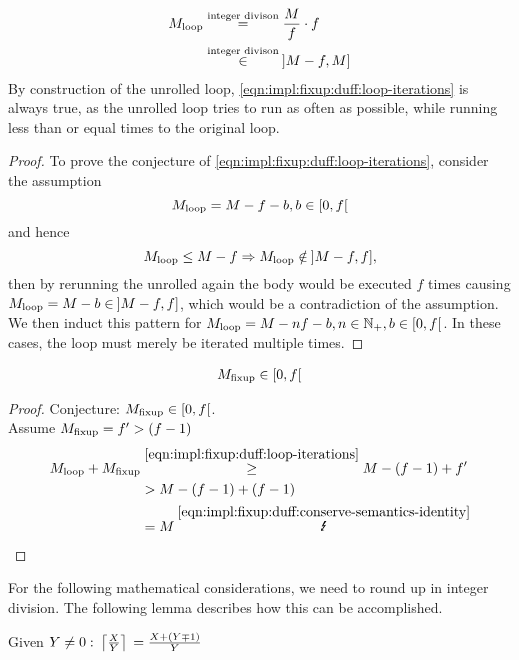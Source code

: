 \begin{equation}\label{eqn:impl:fixup:duff:loop-iterations}
\begin{aligned}
    M_{\text{loop}} &\overset{\text{integer divison}}{=} \frac{M}{f} \cdot f\\
    &\overset{\text{integer divison}}{\in} \medspace \rbrack M-f,M \rbrack
\end{aligned}
\end{equation}
By construction of the unrolled loop, \cref{eqn:impl:fixup:duff:loop-iterations} is always true, as the unrolled loop tries to run as often as possible, while running less than or equal times to the original loop.
\begin{proof}\label{proof:impl:fixup:duff:loop-iterations}
To prove the conjecture of \cref{eqn:impl:fixup:duff:loop-iterations}, consider the assumption
\[M_{\text{loop}} = M - f - b,  b \in \left \lbrack 0, f \right\lbrack \]
and hence
\[M_{\text{loop}} \leq M - f \Rightarrow M_{\text{loop}} \notin \medspace \rbrack M-f,f \rbrack,\]
then by rerunning the unrolled again the body would be executed $f$ times causing $M_{\text{loop}} = M - b \in \medspace \rbrack M-f,f \rbrack$, which would be a contradiction of the assumption.
We then induct this pattern for $M_{\text{loop}} = M - nf - b, n \in \mathbb{N}_{+}, b \in \lbrack 0, f \lbrack $.
In these cases, the loop must merely be iterated multiple times.
\end{proof}

\begin{equation}\label{eqn:impl:fixup:duff:fixup-interval}
\begin{aligned}
    M_{\text{fixup}} \in \lbrack0, f\lbrack
\end{aligned}
\end{equation}

\begin{proof}\label{proof:impl:fixup:duff:fixup-interval}
Conjecture: $M_{\text{fixup}} \in \lbrack0, f\lbrack$.\\

Assume $M_{\text{fixup}} = f' > (f - 1)$
\begin{align*}
    \Mloop + \Mfixup &\overset{\ref{eqn:impl:fixup:duff:loop-iterations}}{\geq} M - (f - 1) + f' \\
    &> M - (f - 1) + (f - 1) \\
    &= M \medspace \overset{\ref{eqn:impl:fixup:duff:conserve-semantics-identity}}{\mLightning}
\end{align*}
\end{proof}

For the following mathematical considerations, we need to round up in integer division.
The following lemma describes how this can be accomplished.
\begin{lem}\label{lem:impl:fixup:duff:ceil-mp}
    Given $Y \neq 0: \medspace \left\lceil{}\frac{X}{Y}\right\rceil{} = \frac{X + (Y \mp 1)}{Y}$
\end{lem}

